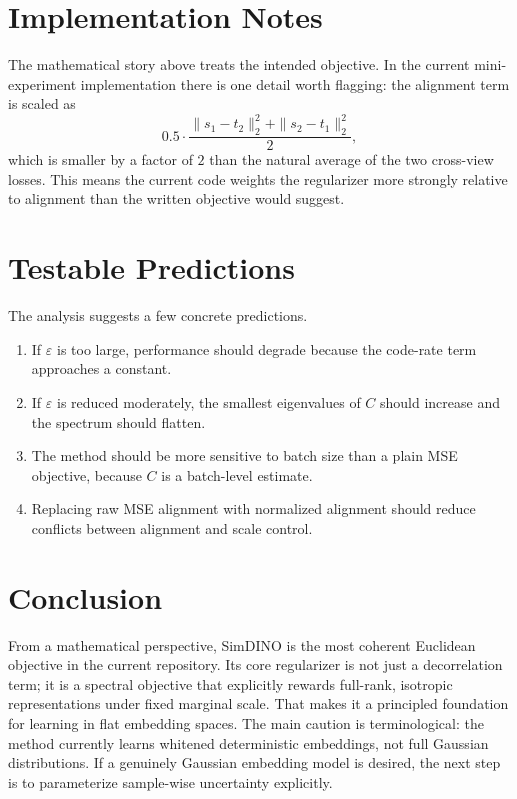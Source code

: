 \documentclass[11pt]{article}
\begin{document}
\section{Implementation Notes}

The mathematical story above treats the intended objective. In the current mini-experiment implementation there is one detail worth flagging: the alignment term is scaled as
\begin{equation}
    0.5 \cdot \frac{\|s_1 - t_2\|_2^2 + \|s_2 - t_1\|_2^2}{2},
\end{equation}
which is smaller by a factor of $2$ than the natural average of the two cross-view losses. This means the current code weights the regularizer more strongly relative to alignment than the written objective would suggest.

\section{Testable Predictions}

The analysis suggests a few concrete predictions.

\begin{enumerate}
    \item If $\varepsilon$ is too large, performance should degrade because the code-rate term approaches a constant.
    \item If $\varepsilon$ is reduced moderately, the smallest eigenvalues of $C$ should increase and the spectrum should flatten.
    \item The method should be more sensitive to batch size than a plain MSE objective, because $C$ is a batch-level estimate.
    \item Replacing raw MSE alignment with normalized alignment should reduce conflicts between alignment and scale control.
\end{enumerate}

\section{Conclusion}

From a mathematical perspective, SimDINO is the most coherent Euclidean objective in the current repository. Its core regularizer is not just a decorrelation term; it is a spectral objective that explicitly rewards full-rank, isotropic representations under fixed marginal scale. That makes it a principled foundation for learning in flat embedding spaces. The main caution is terminological: the method currently learns whitened deterministic embeddings, not full Gaussian distributions. If a genuinely Gaussian embedding model is desired, the next step is to parameterize sample-wise uncertainty explicitly.
\end{document}
